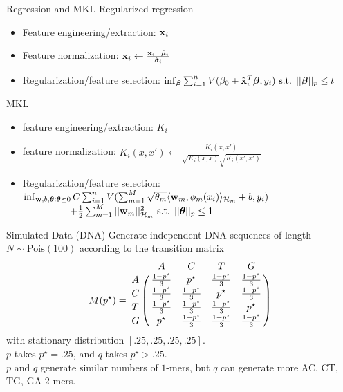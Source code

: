 \documentclass{beamer}
\begin{document}
\begin{frame}{Regression and MKL}
  Regularized regression \pause
  \begin{itemize}
    \item Feature engineering/extraction: ${\bf x}_i$ \pause
    \item Feature normalization: ${\bf x}_i \leftarrow \frac{{\bf x}_i - \hat{\mu}_i}{\hat{\sigma}_i}$ \pause
    \item Regularization/feature selection: $\inf_{{\boldsymbol \beta}} \sum_{i=1}^n V(\beta_0 + \tilde{{\bf x}}_i^T {\boldsymbol \beta}, y_i) \text{ s.t. } || {\boldsymbol \beta} ||_p \leq t$ \pause
  \end{itemize}
  MKL \pause
  \begin{itemize}
    \item feature engineering/extraction: $K_i$ \pause
    \item feature normalization: $K_i(x, x') \leftarrow \frac{K_i(x, x')}{\sqrt{K_i(x, x)}\sqrt{K_i(x', x')}}$ \pause
    \item Regularization/feature selection: $\inf_{{\bf w}, b, {\boldsymbol \theta} : {\boldsymbol \theta} \succeq 0}
      C \sum_{i=1}^n V( \sum_{m=1}^M \sqrt{\theta_m} \langle {\bf w}_m, \phi_m(x_i) \rangle_{\mathcal{H}_m} + b, y_i) $ \\
      $\qquad \qquad \; \; \; + \frac{1}{2} \sum_{m=1}^M || {\bf w}_m ||^2_{\mathcal{H}_m}
      \text{ s.t. } || {\boldsymbol \theta} ||_p \leq 1$
  \end{itemize}
\end{frame}

\begin{frame}{Simulated Data (DNA)}
  Generate independent DNA sequences of length $N \sim \text{Pois}(100)$ according to the transition matrix
  \begin{equation*}
    M(p^{\star}) = \bordermatrix{
      ~ & A & C & T & G \cr
      A & \frac{1-p^{\star}}{3} & p^{\star} & \frac{1-p^{\star}}{3} & \frac{1-p^{\star}}{3} \cr
      C & \frac{1-p^{\star}}{3} & \frac{1-p^{\star}}{3} & p^{\star} & \frac{1-p^{\star}}{3} \cr
      T & \frac{1-p^{\star}}{3} & \frac{1-p^{\star}}{3} & \frac{1-p^{\star}}{3} & p^{\star} \cr
      G & p^{\star} & \frac{1-p^{\star}}{3} & \frac{1-p^{\star}}{3} & \frac{1-p^{\star}}{3} \cr
    }
  \end{equation*}
  with stationary distribution $[.25, .25, .25, .25]$. \\ \pause
  $p$ takes $p^{\star} = .25$, and $q$ takes $p^{\star} > .25$. \\ \pause
  $p$ and $q$ generate similar numbers of $1$-mers, but $q$ can generate more AC, CT, TG, GA $2$-mers.
\end{frame}
\end{document}
